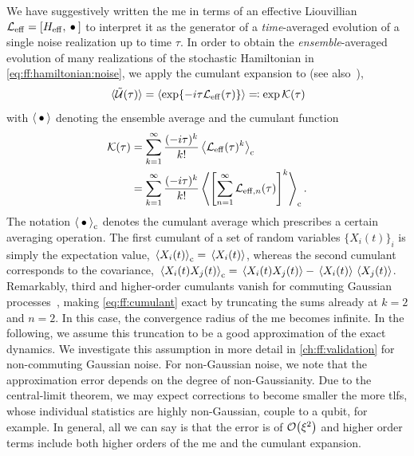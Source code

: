 We have suggestively written the \gls{me} in terms of an effective Liouvillian $\Li_\mr{eff} = \comm{H_\mr{eff}}{\placeholder}$ to interpret it as the generator of a \emph{time}-averaged evolution of a single noise realization up to time $\tau$.
In order to obtain the \emph{ensemble}-averaged evolution of many realizations of the stochastic Hamiltonian in \cref{eq:ff:hamiltonian:noise}, we apply the cumulant expansion to \liouvUe (see also~),
\begin{equation}\label{eq:ff:cumulant_expansion}
    \liouvUetavg = \ev{\exp\lbrace -\i\tau\Li_\mr{eff}(\tau)\rbrace} \eqqcolon \exp\cumulantfun(\tau)
\end{equation}
with $\ev{\placeholder}$ denoting the ensemble average
and the cumulant function~\cite{Kubo1962}
\begin{align}
    \cumulantfun(\tau) &= \sum_{k=1}^\infty\frac{(-\i\tau)^k}{k!}\ev{\Li_\mr{eff}(\tau)^k}_\mr{c} \\
                       &= \sum_{k=1}^\infty\frac{(-\i\tau)^k}{k!}\ev{\left[\sum_{n=1}^\infty \Li_{\mr{eff},n}(\tau)\right]^k}_\mr{c}. \label{eq:ff:cumulant}
\end{align}
The notation $\ev{\placeholder}_\mr{c}$ denotes the cumulant average which prescribes a certain averaging operation.
The first cumulant of a set of random variables $\{X_i(t)\}_i$ is simply the expectation value, $\ev*{X_i(t)}_\mr{c} = \ev*{X_i(t)}$, whereas the second cumulant corresponds to the covariance, $\ev*{X_i(t)X_j(t)}_\mr{c} = \ev*{X_i(t)X_j(t)} - \ev*{X_i(t)}\ev*{X_j(t)}$.
Remarkably, third and higher-order cumulants vanish for commuting
Gaussian processes~\cite{Kubo1963,Szankowski2017}, making \cref{eq:ff:cumulant} exact by truncating the sums already at $k = 2$ and $n = 2$.
In this case, the convergence radius of the \gls{me} becomes infinite.
In the following, we assume this truncation to be a good approximation of the exact dynamics.
We investigate this assumption in more detail in \cref{ch:ff:validation} for non-commuting Gaussian noise.
For non-Gaussian noise, we note that the approximation error depends on the degree of non-Gaussianity.
Due to the central-limit theorem, we may expect corrections to become smaller the more \glspl{tlf}, whose individual statistics are highly non-Gaussian, couple to a qubit, for example.
In general, all we can say is that the error is of $\order{\xi^2}$ and higher order terms include both higher orders of the \gls{me} and the cumulant expansion.

